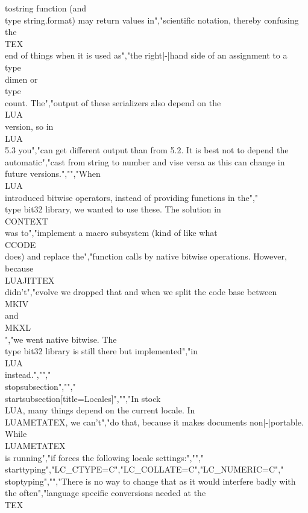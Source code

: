 {tostring} function (and \\type {string.format}) may return values in","scientific notation, thereby confusing the \\TEX\\ end of things when it is used as","the right|-|hand side of an assignment to a \\type {\\dimen} or \\type {\\count}. The","output of these serializers also depend on the \\LUA\\ version, so in \\LUA\\ 5.3 you","can get different output than from 5.2. It is best not to depend the automatic","cast from string to number and vise versa as this can change in future versions.","","When \\LUA\\ introduced bitwise operators, instead of providing functions in the","\\type {bit32} library, we wanted to use these. The solution in \\CONTEXT\\ was to","implement a macro subsystem (kind of like what \\CCODE\\ does) and replace the","function calls by native bitwise operations. However, because \\LUAJITTEX\\ didn't","evolve we dropped that and when we split the code base between \\MKIV\\ and \\MKXL\\","we went native bitwise. The \\type {bit32} library is still there but implemented","in \\LUA\\ instead.","","\\stopsubsection","","\\startsubsection[title={Locales}]","","In stock \\LUA, many things depend on the current locale. In \\LUAMETATEX, we can't","do that, because it makes documents non|-|portable. While \\LUAMETATEX\\ is running","if forces the following locale settings:","","\\starttyping","LC_CTYPE=C","LC_COLLATE=C","LC_NUMERIC=C","\\stoptyping","","There is no way to change that as it would interfere badly with the often","language specific conversions needed at the \\TEX\\ 